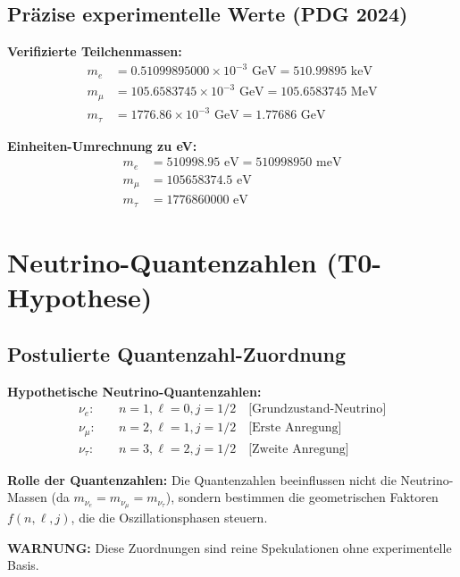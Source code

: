 \documentclass[12pt,a4paper]{article}
\begin{document}
	\subsection{Präzise experimentelle Werte (PDG 2024)}
	
	\begin{experimental}
		\textbf{Verifizierte Teilchenmassen:}
		\begin{align}
			m_e &= 0.51099895000 \times 10^{-3} \text{ GeV} = 510.99895 \text{ keV} \\
			m_\mu &= 105.6583745 \times 10^{-3} \text{ GeV} = 105.6583745 \text{ MeV} \\
			m_\tau &= 1776.86 \times 10^{-3} \text{ GeV} = 1.77686 \text{ GeV}
		\end{align}
		
		\textbf{Einheiten-Umrechnung zu eV:}
		\begin{align}
			m_e &= 510998.95 \text{ eV} = 510998950 \text{ meV} \\
			m_\mu &= 105658374.5 \text{ eV} \\
			m_\tau &= 1776860000 \text{ eV}
		\end{align}
	\end{experimental}
	
	\section{Neutrino-Quantenzahlen (T0-Hypothese)}
	
	\subsection{Postulierte Quantenzahl-Zuordnung}
	
	\begin{speculation}
		\textbf{Hypothetische Neutrino-Quantenzahlen:}
		\begin{align}
			\nu_e: &\quad n=1, \ell=0, j=1/2 \quad \text{[Grundzustand-Neutrino]} \\
			\nu_\mu: &\quad n=2, \ell=1, j=1/2 \quad \text{[Erste Anregung]} \\
			\nu_\tau: &\quad n=3, \ell=2, j=1/2 \quad \text{[Zweite Anregung]}
		\end{align}
		
		\textbf{Rolle der Quantenzahlen:}
		Die Quantenzahlen beeinflussen nicht die Neutrino-Massen (da \(m_{\nu_e} = m_{\nu_\mu} = m_{\nu_\tau}\)), sondern bestimmen die geometrischen Faktoren \(f(n, \ell, j)\), die die Oszillationsphasen steuern.
		
		\textbf{WARNUNG:} Diese Zuordnungen sind reine Spekulationen ohne experimentelle Basis.
	\end{speculation}
	
\end{document}
